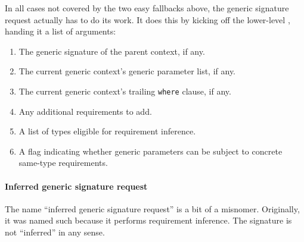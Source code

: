 \documentclass[../generics]{subfiles}
\begin{document}
In all cases not covered by the two easy fallbacks above, the generic signature request actually has to do its work. It does this by kicking off the lower-level , handing it a list of arguments:
\begin{enumerate}
\item The generic signature of the parent context, if any.
\item The current generic context's generic parameter list, if any.
\item The current generic context's trailing \texttt{where} clause, if any.
\item Any additional requirements to add.
\item A list of types eligible for requirement inference.
\item A flag indicating whether generic parameters can be subject to concrete same-type requirements.
\end{enumerate}

\paragraph{Inferred generic signature request} The name ``inferred generic signature request'' is a bit of a misnomer. Originally, it was named such because it performs requirement inference. The signature is not ``inferred'' in any sense.
\end{document}
